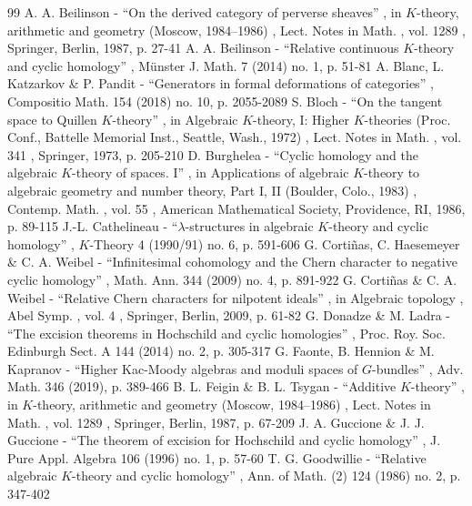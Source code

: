 \documentclass[11pt]{article}
\providecommand{\backmatter}{}
\theoremstyle{definition}
\begin{document}
\backmatter


\begin{thebibliography}{99}
 A. A. Beilinson - “On the derived category of perverse sheaves” , in $K$-theory, arithmetic and geometry (Moscow, 1984–1986) , Lect. Notes in Math. , vol. 1289 , Springer, Berlin, 1987, p. 27-41
 A. A. Beilinson - “Relative continuous $K$-theory and cyclic homology” , Münster J. Math. 7 (2014) no. 1, p. 51-81
 A. Blanc, L. Katzarkov \& P. Pandit - “Generators in formal deformations of categories” , Compositio Math. 154 (2018) no. 10, p. 2055-2089
 S. Bloch - “On the tangent space to Quillen $K$-theory” , in Algebraic $K$-theory, I: Higher $K$-theories (Proc. Conf., Battelle Memorial Inst., Seattle, Wash., 1972) , Lect. Notes in Math. , vol. 341 , Springer, 1973, p. 205-210
 D. Burghelea - “Cyclic homology and the algebraic $K$-theory of spaces. I” , in Applications of algebraic $K$-theory to algebraic geometry and number theory, Part I, II (Boulder, Colo., 1983) , Contemp. Math. , vol. 55 , American Mathematical Society, Providence, RI, 1986, p. 89-115
 J.-L. Cathelineau - “$\lambda $-structures in algebraic $K$-theory and cyclic homology” , $K$-Theory 4 (1990/91) no. 6, p. 591-606
 G. Cortiñas, C. Haesemeyer \& C. A. Weibel - “Infinitesimal cohomology and the Chern character to negative cyclic homology” , Math. Ann. 344 (2009) no. 4, p. 891-922
 G. Cortiñas \& C. A. Weibel - “Relative Chern characters for nilpotent ideals” , in Algebraic topology , Abel Symp. , vol. 4 , Springer, Berlin, 2009, p. 61-82
 G. Donadze \& M. Ladra - “The excision theorems in Hochschild and cyclic homologies” , Proc. Roy. Soc. Edinburgh Sect. A 144 (2014) no. 2, p. 305-317
 G. Faonte, B. Hennion \& M. Kapranov - “Higher Kac-Moody algebras and moduli spaces of $G$-bundles” , Adv. Math. 346 (2019), p. 389-466
 B. L. Feigin \& B. L. Tsygan - “Additive $K$-theory” , in $K$-theory, arithmetic and geometry (Moscow, 1984–1986) , Lect. Notes in Math. , vol. 1289 , Springer, Berlin, 1987, p. 67-209
 J. A. Guccione \& J. J. Guccione - “The theorem of excision for Hochschild and cyclic homology” , J. Pure Appl. Algebra 106 (1996) no. 1, p. 57-60
 T. G. Goodwillie - “Relative algebraic $K$-theory and cyclic homology” , Ann. of Math. (2) 124 (1986) no. 2, p. 347-402

\end{thebibliography}
\end{document}
